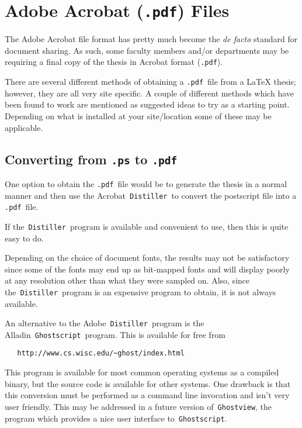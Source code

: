 %
%
%

\newcommand{\pdf}{\mbox{\tt *.pdf}}

\chapter{Adobe Acrobat (\pdf ) Files}
The Adobe Acrobat file format has pretty much become the {\em de facto}
standard for document sharing.  As such, some faculty members and/or
departments may be requiring a final copy of the thesis in Acrobat format
(\pdf ).

There are several different methods of obtaining a \pdf\ file from a \LaTeX{}
thesis; however, they are all very site specific.  A couple of different
methods which have been found to work are mentioned as suggested ideas to try
as a starting point.  Depending on what is installed at your site/location some
of these may be applicable.

\section{Converting from {\tt *.ps} to \pdf}
One option to obtain the \pdf\ file would be to generate the thesis in a normal
manner and then use the Acrobat\ {\tt Distiller}\ to convert the postscript file into a
\pdf\ file.

If the\ {\tt Distiller}\ program is available and convenient to use, then this is quite easy to do.

Depending on the choice of document fonts, the results may not be satisfactory since
some of the fonts may end up as bit-mapped fonts and will display poorly at any resolution
other than what they were sampled on.  Also, since the\ {\tt Distiller}\ program is an expensive
program to obtain, it is not always available.

An alternative to the Adobe\ {\tt Distiller}\ program is the Alladin\ {\tt Ghostscript}\ program.  This is
available for free from

{\tt \verb|   http://www.cs.wisc.edu/~ghost/index.html|}

This program is available for most common operating systems as a compiled binary, but the source code
is available for other systems.  One drawback is that this conversion must be performed as a
command line invocation and isn't very user friendly.  This may be addressed in a future version of\
{\tt Ghostview}, the program which provides a nice user interface to\ {\tt Ghostscript}.

